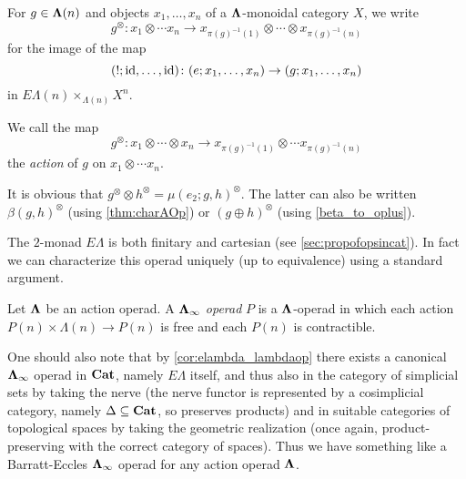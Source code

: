 \begin{nota}\label{tensor_notation}
For $g \in \mathbf{\Lambda}(n)$ and objects $x_1, \ldots, x_n$ of a $\mathbf{\Lambda}$-monoidal category $X$, we write 
  \[
    g^{\otimes} \colon x_1 \otimes \cdots x_n \rightarrow x_{\pi(g)^{-1}(1)} \otimes \cdots \otimes x_{\pi(g)^{-1}(n)}
  \]
for the image of the map
  \[
    (!; \textrm{id}, \ldots, \textrm{id}) \colon  (e; x_1, \ldots, x_n) \rightarrow (g; x_1, \ldots, x_n)
  \]
in $E\Lambda(n) \times_{\Lambda(n)} X^{n}$.
\end{nota}

\begin{Defi}\label{action_map}
We call the map 
  \[
    g^{\otimes} \colon x_1 \otimes \cdots \otimes x_n \rightarrow x_{\pi(g)^{-1}(1)} \otimes \cdots x_{\pi(g)^{-1}(n)}
  \]
the \emph{action} of $g$ on $x_1 \otimes \cdots x_n$.
\end{Defi}

\begin{rem}
It is obvious that $g^{\otimes} \otimes h^{\otimes} = \mu(e_2; g, h)^{\otimes}$. The latter can also be written $\beta(g, h)^{\otimes}$ (using \cref{thm:charAOp}) or $(g \oplus h)^{\otimes}$  (using \cref{beta_to_oplus}).
\end{rem}

The $2$-monad $E\Lambda$ is both finitary and cartesian (see \cref{sec:propofopsincat}). In fact we can characterize this operad uniquely (up to equivalence) using a standard argument.

\begin{Defi}
Let $\mathbf{\Lambda}$ be an action operad. A \textit{$\mathbf{\Lambda}_{\infty}$ operad} $P$ is a $\mathbf{\Lambda}$-operad in which each action $P(n) \times \Lambda(n) \rightarrow P(n)$ is free and each $P(n)$ is contractible.
\end{Defi}

\begin{rem}
One should also note that by \cref{cor:elambda_lambdaop} there exists a canonical $\mathbf{\Lambda}_{\infty}$ operad in $\mathbf{Cat}$, namely $E\Lambda$ itself, and thus also in the category of simplicial sets by taking the nerve (the nerve functor is represented by a cosimplicial category, namely $\Delta \subseteq \mathbf{Cat}$, so preserves products) and in suitable categories of topological spaces by taking the geometric realization (once again, product-preserving with the correct category of spaces). Thus we have something like a Barratt-Eccles $\mathbf{\Lambda}_{\infty}$ operad for any action operad $\mathbf{\Lambda}$.
\end{rem}

